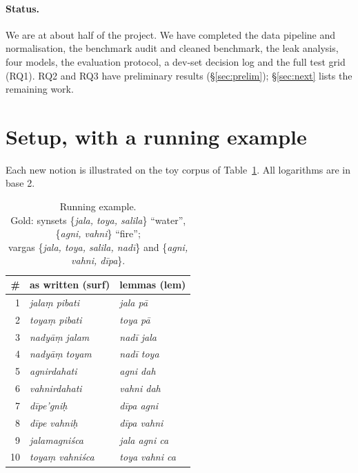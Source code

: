 \documentclass[11pt]{article}
\newcommand{\vk}[1]{\textsf{#1}}
\begin{document}
\paragraph{Status.} We are at about half of the project. We have completed the data
pipeline and normalisation, the benchmark audit and cleaned benchmark, the
leak analysis, four models, the evaluation protocol, a dev-set decision log
and the full test grid (RQ1). RQ2 and RQ3 have preliminary results
(\S\ref{sec:prelim}); \S\ref{sec:next} lists the remaining work.

\section{Setup, with a running example}\label{sec:setup}
Each new notion is illustrated on the toy corpus of Table~\ref{tab:toy}.
All logarithms are in base 2.

\begin{table}[t]\centering\footnotesize
\setlength{\tabcolsep}{4pt}
\begin{tabular}{rll}
\toprule
\# & as written (\vk{surf}) & lemmas (\vk{lem})\\
\midrule
1 & \emph{jalaṃ pibati} & \emph{jala pā}\\
2 & \emph{toyaṃ pibati} & \emph{toya pā}\\
3 & \emph{nadyāṃ jalam} & \emph{nadī jala}\\
4 & \emph{nadyāṃ toyam} & \emph{nadī toya}\\
5 & \emph{agnirdahati} & \emph{agni dah}\\
6 & \emph{vahnirdahati} & \emph{vahni dah}\\
7 & \emph{dīpe'gniḥ} & \emph{dīpa agni}\\
8 & \emph{dīpe vahniḥ} & \emph{dīpa vahni}\\
9 & \emph{jalamagniśca} & \emph{jala agni ca}\\
10 & \emph{toyaṃ vahniśca} & \emph{toya vahni ca}\\
\bottomrule
\end{tabular}
\caption{Running example. \\ Gold: synsets \{\emph{jala, toya, salila}\}
``water'', \{\emph{agni, vahni}\} ``fire''; \\ vargas \{\emph{jala, toya,
salila, nadī}\} and \{\emph{agni, vahni, dīpa}\}.}
\label{tab:toy}
\end{table}
\end{document}
